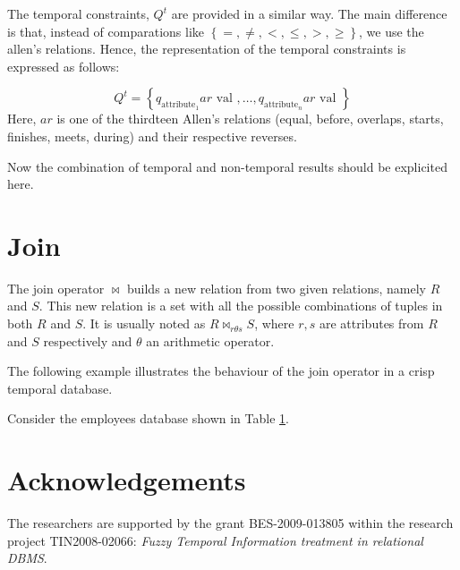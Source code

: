 \documentclass{llncs}
\begin{document}
The temporal constraints, $Q^t$ are provided in a similar way. The main difference is that, instead of comparations like $\left \lbrace =, \neq, <, \leq, >, \geq \right \rbrace$, we use the allen's relations. Hence, the representation of the temporal constraints is expressed as follows:

\begin{equation}
\label{eq:temporal-constratins}
Q^{t} = \left \lbrace q_{\mbox{attribute}_1}  ar \mbox{ val }, \ldots, q_{\mbox{attribute}_n}  ar \mbox{ val } \right \rbrace
\end{equation}
Here, $ar$ is one of the thirdteen Allen's relations (equal, before, overlaps, starts, finishes, meets, during) and their respective reverses.


Now the combination of temporal and non-temporal results should be explicited here.


\section{\label{sec:join}Join}
The join operator $\Join$ builds a new relation from two given relations, namely $R$ and $S$. This new relation is a set with all the possible combinations of tuples in both $R$ and $S$. It is usually noted as $R \Join_{r \theta s} S$, where $r,s$ are attributes from $R$ and $S$ respectively and $\theta$ an arithmetic operator.

The following example illustrates the behaviour of the join operator in a crisp temporal database.

\begin{example}
Consider the employees database shown in Table \ref{}.  
\end{example}



\section*{Acknowledgements}
%
The researchers are supported by the grant BES-2009-013805 within the research project TIN2008-02066: \emph{Fuzzy Temporal Information treatment in relational DBMS}.



\end{document}
